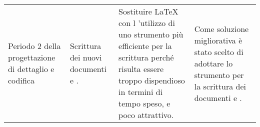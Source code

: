{\begin{longtable}{ C{3cm} C{4cm} C{3cm} C{4cm}}
	Periodo 2 della progettazione di dettaglio e codifica & Scrittura dei nuovi documenti \MM{} e \MU{}. & Sostituire \LaTeX{} con l 'utilizzo di uno strumento più efficiente per la scrittura perché risulta essere troppo dispendioso in termini di tempo speso, e poco attrattivo. & Come soluzione migliorativa è stato scelto di adottare lo strumento  per la scrittura dei documenti \MM{} e \MU{}.\\
	
	
\end{longtable}
}






